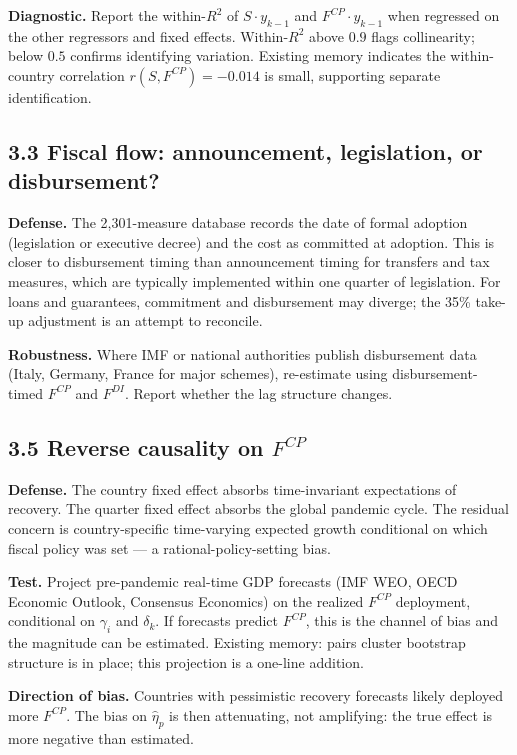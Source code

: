 \documentclass[11pt,a4paper]{article}
\begin{document}
\textbf{Diagnostic.} Report the within-$R^2$ of $S \cdot y_{k-1}$ and $F^{CP} \cdot y_{k-1}$ when regressed on the other regressors and fixed effects. Within-$R^2$ above $0.9$ flags collinearity; below $0.5$ confirms identifying variation. Existing memory indicates the within-country correlation $r(S, F^{CP}) = -0.014$ is small, supporting separate identification.

\subsection*{3.3 Fiscal flow: announcement, legislation, or disbursement?}

\textbf{Defense.} The 2{,}301-measure database records the date of formal adoption (legislation or executive decree) and the cost as committed at adoption. This is closer to disbursement timing than announcement timing for transfers and tax measures, which are typically implemented within one quarter of legislation. For loans and guarantees, commitment and disbursement may diverge; the 35\% take-up adjustment is an attempt to reconcile.

\textbf{Robustness.} Where IMF or national authorities publish disbursement data (Italy, Germany, France for major schemes), re-estimate using disbursement-timed $F^{CP}$ and $F^{DI}$. Report whether the lag structure changes.

\subsection*{3.5 Reverse causality on $F^{CP}$}

\textbf{Defense.} The country fixed effect absorbs time-invariant expectations of recovery. The quarter fixed effect absorbs the global pandemic cycle. The residual concern is country-specific time-varying expected growth conditional on which fiscal policy was set --- a rational-policy-setting bias.

\textbf{Test.} Project pre-pandemic real-time GDP forecasts (IMF WEO, OECD Economic Outlook, Consensus Economics) on the realized $F^{CP}$ deployment, conditional on $\gamma_i$ and $\delta_k$. If forecasts predict $F^{CP}$, this is the channel of bias and the magnitude can be estimated. Existing memory: pairs cluster bootstrap structure is in place; this projection is a one-line addition.

\textbf{Direction of bias.} Countries with pessimistic recovery forecasts likely deployed more $F^{CP}$. The bias on $\hat\eta_p$ is then attenuating, not amplifying: the true effect is more negative than estimated.
\end{document}
